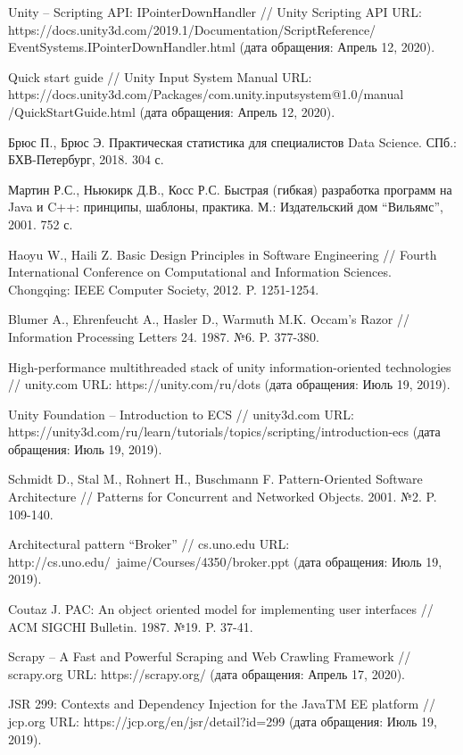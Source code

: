 \begin{thebibliography}{9}
	 Unity -- Scripting API: IPointerDownHandler // Unity Scripting API URL: https://docs.unity3d.com/2019.1/Documentation/ScriptReference/ EventSystems.IPointerDownHandler.html (дата обращения: Апрель 12, 2020).
	
	 Quick start guide // Unity Input System Manual URL: https://docs.unity3d.com/Packages/com.unity.inputsystem@1.0/manual /QuickStartGuide.html (дата обращения: Апрель 12, 2020).
	
	 Брюс П., Брюс Э. Практическая статистика для специалистов Data Science. СПб.: БХВ-Петербург, 2018. 304 с.
	
	 Мартин Р.С., Ньюкирк Д.В., Косс Р.С. Быстрая (гибкая) разработка программ на Java и C++: принципы, шаблоны, практика. М.: Издательский дом ``Вильямс'', 2001. 752 с.

	 Haoyu W., Haili Z. Basic Design Principles in Software Engineering // Fourth International Conference on Computational and Information Sciences. Chongqing: IEEE Computer Society, 2012. P. 1251-1254.
	
	 Blumer A., Ehrenfeucht A., Hasler D., Warmuth M.K. Occam's Razor // Information Processing Letters 24. 1987. №6. P. 377-380.
	
	 High-performance multithreaded stack of unity information-oriented technologies // unity.com URL: https://unity.com/ru/dots (дата обращения: Июль 19, 2019).
	
	 Unity Foundation -- Introduction to ECS // unity3d.com URL: https://unity3d.com/ru/learn/tutorials/topics/scripting/introduction-ecs (дата обращения: Июль 19, 2019).
	
	 Schmidt D., Stal M., Rohnert H., Buschmann F. Pattern-Oriented Software Architecture // Patterns for Concurrent and Networked Objects. 2001. №2. P. 109-140.
	
	 Architectural pattern ``Broker'' // cs.uno.edu URL: http://cs.uno.edu/~jaime/Courses/4350/broker.ppt (дата обращения: Июль 19, 2019).
	
	 Coutaz J. PAC: An object oriented model for implementing user interfaces // ACM SIGCHI Bulletin. 1987. №19. P. 37-41.
	
	 Scrapy -- A Fast and Powerful Scraping and Web Crawling Framework // scrapy.org URL: https://scrapy.org/ (дата обращения: Апрель 17, 2020).
	
	 JSR 299: Contexts and Dependency Injection for the JavaTM EE platform // jcp.org URL: https://jcp.org/en/jsr/detail?id=299 (дата обращения: Июль 19, 2019).
	

\end{thebibliography}
